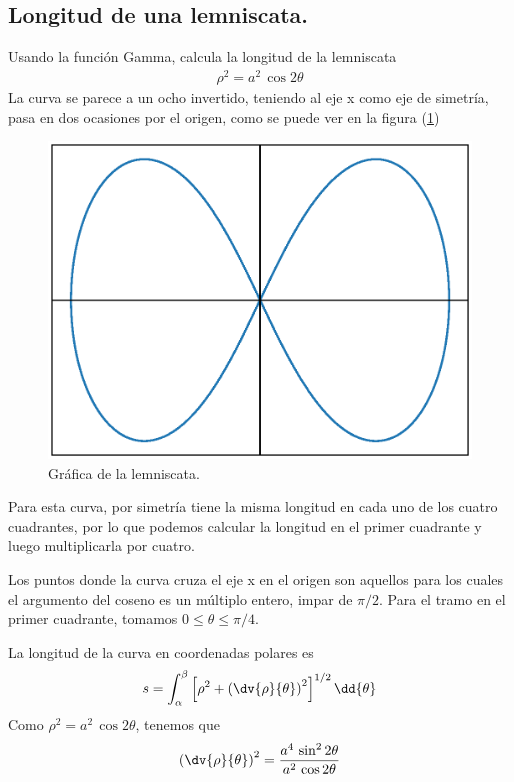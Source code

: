 \subsection*{Longitud de una lemniscata.}
Usando la función Gamma, calcula la longitud de la lemniscata
\begin{align*}
\rho^{2} = a^{2} \, \cos 2 \theta
\end{align*}
La curva se parece a un ocho invertido, teniendo al eje x como eje de simetría, pasa en dos ocasiones por el origen, como se puede ver en la figura (\ref{fig:figura_01})
\begin{figure}[!ht]
    \centering
    \includegraphics[scale=0.75]{Imagenes/plot_leminscata_01.eps}
    \caption{Gráfica de la lemniscata.}
    \label{fig:figura_01}
\end{figure}
Para esta curva, por simetría tiene la misma longitud en cada uno de los cuatro cuadrantes, por lo que podemos calcular la longitud en el primer cuadrante y luego multiplicarla por cuatro.
\par
Los puntos donde la curva cruza el eje x en el origen son aquellos para los cuales el argumento del coseno es un múltiplo entero, impar de $\pi / 2$. Para el tramo en el primer cuadrante, tomamos $0 \leq \theta \leq \pi/4$.
\par
La longitud de la curva en coordenadas polares es
\begin{align*}
s = \int_{\alpha}^{\beta} \left[ \rho^{2} + \left( \dv{\rho}{\theta} \right)^{2} \right]^{1/2} \dd{\theta}
\end{align*}
Como $\rho^{2} = a^{2} \, \cos 2 \theta$, tenemos que
\begin{align*}
\left( \dv{\rho}{\theta} \right)^{2} = \dfrac{a^{4} \, \sin^{2} 2 \theta}{a^{2} \, \cos 2 \theta}
\end{align*}
